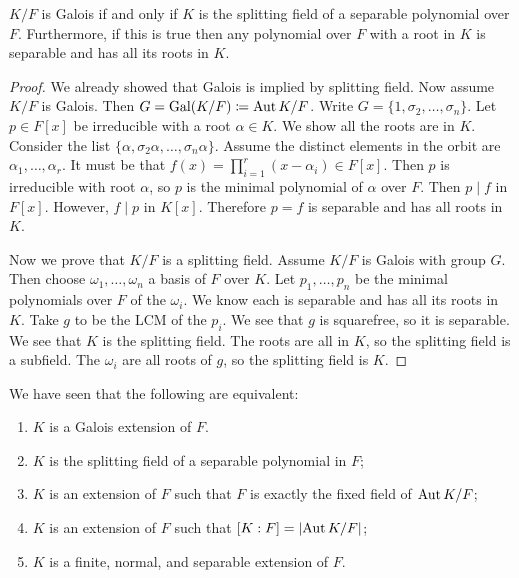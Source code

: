 \documentclass[10pt, twoside]{article}
\begin{document}
    \begin{thm}
        $K/F$ is Galois if and only if $K$ is the splitting field of a separable polynomial over $F$. Furthermore, if this is true then any polynomial over $F$ with a root in $K$ is separable and has all its roots in $K$.
        \begin{proof}
            We already showed that Galois is implied by splitting field. Now assume $K/F$ is Galois. Then $G = \mathrm{Gal}(K/F) \coloneqq \operatorname{Aut}{K/F}$. Write $G = \{1, \sigma_2, \ldots, \sigma_n\}$. Let $p \in F[x]$ be irreducible with a root $\alpha \in K$. We show all the roots are in $K$. Consider the list $\{\alpha, \sigma_2 \alpha, \ldots, \sigma_n \alpha\}$. Assume the distinct elements in the orbit are $\alpha_1, \ldots, \alpha_r$. It must be that $f(x) = \prod_{i=1}^r (x-\alpha_i) \in F[x]$. Then $p$ is irreducible with root $\alpha$, so $p$ is the minimal polynomial of $\alpha$ over $F$. Then $p \mid f$ in $F[x]$. However, $f \mid p$ in $K[x]$. Therefore $p = f$ is separable and has all roots in $K$.

            Now we prove that $K/F$ is a splitting field. Assume $K/F$ is Galois with group $G$. Then choose $\omega_1, \ldots, \omega_n$ a basis of $F$ over $K$. Let $p_1, \ldots, p_n$ be the minimal polynomials over $F$ of the $\omega_i$. We know each is separable and has all its roots in $K$. Take $g$ to be the $\mathrm{LCM}$ of the $p_i$. We see that $g$ is squarefree, so it is separable. We see that $K$ is the splitting field. The roots are all in $K$, so the splitting field is a subfield. The $\omega_i$ are all roots of $g$, so the splitting field is $K$.
        \end{proof}
    \end{thm}

    We have seen that the following are equivalent:
    \begin{enumerate}
        \item $K$ is a Galois extension of $F$.
        \item $K$ is the splitting field of a separable polynomial in $F$;
        \item $K$ is an extension of $F$ such that $F$ is exactly the fixed field of $\operatorname{Aut}{K/F}$;
        \item $K$ is an extension of $F$ such that $[K:F] = \lvert\operatorname{Aut}{K/F}\rvert$;
        \item $K$ is a finite, normal, and separable extension of $F$.
    \end{enumerate}
\end{document}
